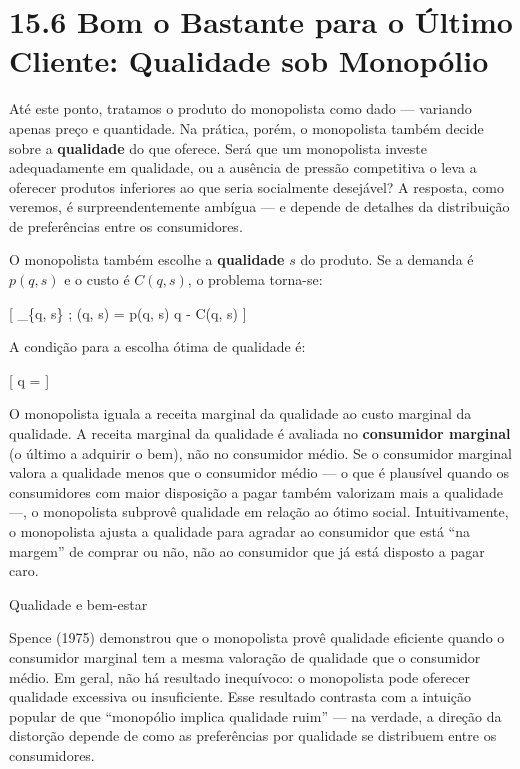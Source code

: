 \documentclass[11pt,twoside,openright]{book}
\begin{document}
\section{15.6 Bom o Bastante para o Último Cliente: Qualidade sob
Monopólio}\label{156}

Até este ponto, tratamos o produto do monopolista como dado --- variando
apenas preço e quantidade. Na prática, porém, o monopolista também
decide sobre a \textbf{qualidade} do que oferece. Será que um
monopolista investe adequadamente em qualidade, ou a ausência de pressão
competitiva o leva a oferecer produtos inferiores ao que seria
socialmente desejável? A resposta, como veremos, é surpreendentemente
ambígua --- e depende de detalhes da distribuição de preferências entre
os consumidores.

O monopolista também escolhe a \textbf{qualidade} \(s\) do produto. Se a
demanda é \(p(q, s)\) e o custo é \(C(q, s)\), o problema torna-se:

{[} \max\_\{q, s\} ; \pi(q, s) = p(q, s) \cdot q - C(q, s) {]}

A condição para a escolha ótima de qualidade é:

{[}  \cdot q =
 \label{eq:15.11}  {]}

O monopolista iguala a receita marginal da qualidade ao custo marginal
da qualidade. A receita marginal da qualidade é avaliada no
\textbf{consumidor marginal} (o último a adquirir o bem), não no
consumidor médio. Se o consumidor marginal valora a qualidade menos que
o consumidor médio --- o que é plausível quando os consumidores com
maior disposição a pagar também valorizam mais a qualidade ---, o
monopolista subprovê qualidade em relação ao ótimo social.
Intuitivamente, o monopolista ajusta a qualidade para agradar ao
consumidor que está ``na margem'' de comprar ou não, não ao consumidor
que já está disposto a pagar caro.

\begin{notebox}{Qualidade e bem-estar}

Spence (1975) demonstrou que o monopolista provê qualidade eficiente
quando o consumidor marginal tem a mesma valoração de qualidade que o
consumidor médio. Em geral, não há resultado inequívoco: o monopolista
pode oferecer qualidade excessiva ou insuficiente. Esse resultado
contrasta com a intuição popular de que ``monopólio implica qualidade
ruim'' --- na verdade, a direção da distorção depende de como as
preferências por qualidade se distribuem entre os consumidores.

\end{notebox}
\end{document}
